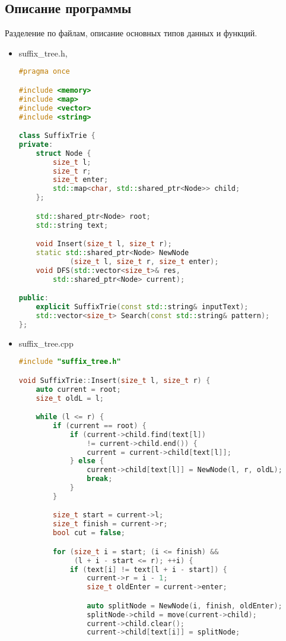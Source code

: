 \documentclass[12pt]{article}
\begin{document}
\subsection*{Описание программы}

Разделение по файлам, описание основных типов данных и функций. \\
\begin{itemize}
    \item
        suffix\_tree.h,
        \begin{lstlisting}[language=C++]
#pragma once 

#include <memory>
#include <map>
#include <vector>
#include <string>

class SuffixTrie {
private:
    struct Node {
        size_t l;
        size_t r;
        size_t enter;
        std::map<char, std::shared_ptr<Node>> child;
    };

    std::shared_ptr<Node> root;
    std::string text;

    void Insert(size_t l, size_t r);
    static std::shared_ptr<Node> NewNode
            (size_t l, size_t r, size_t enter);
    void DFS(std::vector<size_t>& res,
        std::shared_ptr<Node> current);

public:
    explicit SuffixTrie(const std::string& inputText);
    std::vector<size_t> Search(const std::string& pattern);
};
        \end{lstlisting}
        \item
        suffix\_tree.cpp
        \begin{lstlisting}[language=C++]
#include "suffix_tree.h"

void SuffixTrie::Insert(size_t l, size_t r) {
    auto current = root;
    size_t oldL = l;

    while (l <= r) {
        if (current == root) {
            if (current->child.find(text[l]) 
                != current->child.end()) {
                current = current->child[text[l]];
            } else {
                current->child[text[l]] = NewNode(l, r, oldL);
                break;
            }
        }

        size_t start = current->l;
        size_t finish = current->r;
        bool cut = false;

        for (size_t i = start; (i <= finish) &&
             (l + i - start <= r); ++i) {
            if (text[i] != text[l + i - start]) {
                current->r = i - 1;
                size_t oldEnter = current->enter;

                auto splitNode = NewNode(i, finish, oldEnter);
                splitNode->child = move(current->child);
                current->child.clear();
                current->child[text[i]] = splitNode;


\end{lstlisting}
\end{itemize}
\end{document}
